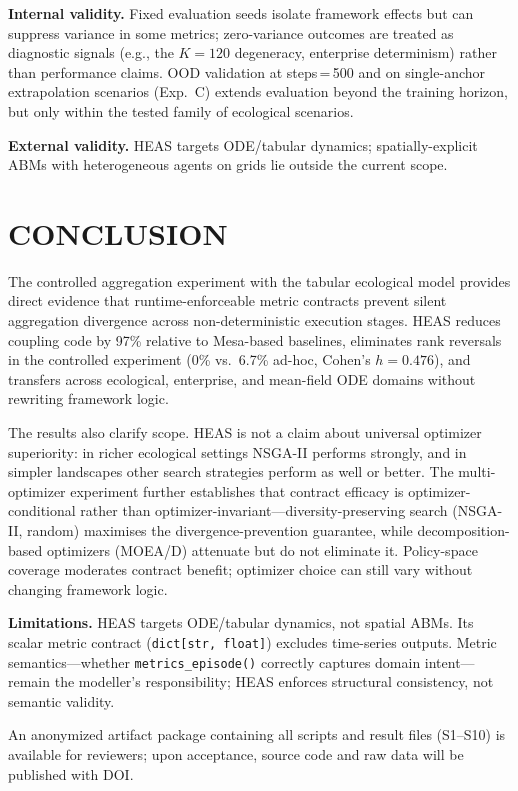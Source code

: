 \documentclass{wscpaperproc}
\begin{document}
\textbf{Internal validity.} Fixed evaluation seeds isolate framework effects
but can suppress variance in some metrics; zero-variance outcomes are treated as
diagnostic signals (e.g., the $K\!=\!120$ degeneracy, enterprise determinism)
rather than performance claims. OOD validation at steps\,=\,500 and on
single-anchor extrapolation scenarios (Exp.~C) extends evaluation beyond the
training horizon, but only within the tested family of ecological scenarios.

\textbf{External validity.} HEAS targets ODE/tabular dynamics; spatially-explicit ABMs
with heterogeneous agents on grids lie outside the current scope.

\section{CONCLUSION}

The controlled aggregation experiment with the tabular ecological model provides
direct evidence that runtime-enforceable metric contracts prevent silent
aggregation divergence across non-deterministic execution stages. HEAS reduces
coupling code by 97\% relative to Mesa-based baselines, eliminates rank reversals
in the controlled experiment (0\% vs.\ 6.7\% ad-hoc, Cohen's $h = 0.476$), and
transfers across ecological, enterprise, and mean-field ODE domains without
rewriting framework logic.

The results also clarify scope. HEAS is not a claim about universal optimizer
superiority: in richer ecological settings NSGA-II performs strongly, and in
simpler landscapes other search strategies perform as well or better. The
multi-optimizer experiment further establishes that contract efficacy is
optimizer-conditional rather than optimizer-invariant---diversity-preserving
search (NSGA-II, random) maximises the divergence-prevention guarantee, while
decomposition-based optimizers (MOEA/D) attenuate but do not eliminate it.
Policy-space coverage moderates contract benefit; optimizer choice can still
vary without changing framework logic.

\textbf{Limitations.} HEAS targets ODE/tabular dynamics, not spatial ABMs. Its
scalar metric contract (\texttt{dict[str, float]}) excludes time-series outputs.
Metric semantics---whether \texttt{metrics\_episode()} correctly captures domain
intent---remain the modeller's responsibility; HEAS enforces structural
consistency, not semantic validity.

An anonymized artifact package containing all scripts and result files (S1--S10)
is available for reviewers; upon acceptance, source code and raw data will be
published with DOI.
\end{document}

